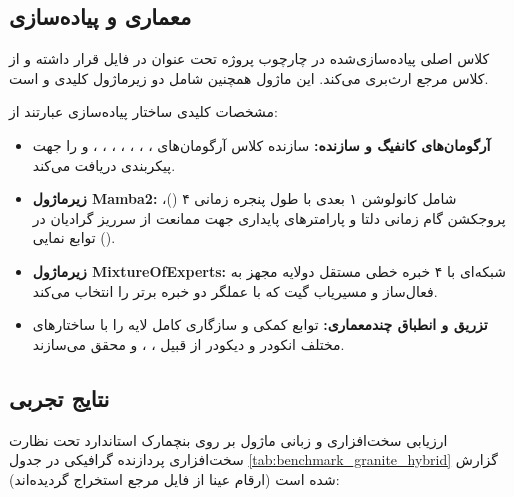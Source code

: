 \subsection{معماری و پیاده‌سازی}
کلاس اصلی پیاده‌سازی‌شده در چارچوب پروژه تحت عنوان  در فایل  قرار داشته و از کلاس مرجع  ارث‌بری می‌کند. این ماژول همچنین شامل دو زیرماژول کلیدی  و  است.

مشخصات کلیدی ساختار پیاده‌سازی عبارتند از:
\begin{itemize}
    \item \textbf{آرگومان‌های کانفیگ و سازنده:} سازنده کلاس آرگومان‌های ، ، ، ، ، ، ،  و  را جهت پیکربندی دریافت می‌کند.
    \item \textbf{زیرماژول Mamba2:} شامل کانولوشن ۱ بعدی با طول پنجره زمانی ۴ ()، پروجکشن گام زمانی دلتا  و پارامترهای پایداری جهت ممانعت از سرریز گرادیان در توابع نمایی ().
    \item \textbf{زیرماژول MixtureOfExperts:} شبکه‌ای با ۴ خبره خطی مستقل دولایه مجهز به فعال‌ساز  و مسیریاب گیت  که با عملگر  دو خبره برتر را انتخاب می‌کند.
    \item \textbf{تزریق و انطباق چندمعماری:} توابع کمکی  و  سازگاری کامل لایه را با ساختارهای مختلف انکودر و دیکودر از قبیل ، ،  و  محقق می‌سازند.
\end{itemize}

\subsection{نتایج تجربی}
ارزیابی سخت‌افزاری و زبانی ماژول  بر روی بنچمارک استاندارد  تحت نظارت سخت‌افزاری پردازنده گرافیکی در جدول \ref{tab:benchmark_granite_hybrid} گزارش شده است (ارقام عینا از فایل مرجع  استخراج گردیده‌اند):

